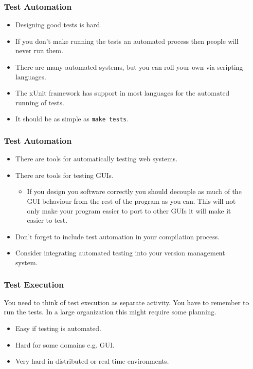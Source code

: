 \documentclass{beamer}
\begin{document}
\begin{frame}
  \frametitle{Test Automation}
  \begin{itemize}
  \item Designing good tests is hard.
  \item If you don't make running the tests an automated process then
    people will never run them.
  \item There are many automated systems, but you can roll your own
    via scripting languages.   
  \item The xUnit framework has support in most languages for the
    automated running of tests. 
  \item It should be as simple as {\tt make tests}.
  \end{itemize}
\end{frame}
\begin{frame}
  \frametitle{Test Automation}
  \begin{itemize}
  \item There are tools for automatically testing web systems.
  \item There are tools for testing GUIs.
    \begin{itemize}
    \item If you design you software correctly you should decouple as
      much of the GUI behaviour from the rest of the program as you
      can. This will not only make your program easier to port to
      other GUIs it will make it easier to test.
    \end{itemize}
  \item Don't forget to include test  automation in your compilation process.
  \item Consider integrating automated testing into your version
    management system.  
  \end{itemize}
\end{frame}
\begin{frame}
  \frametitle{Test Execution}
You need to think of test execution as separate activity. You have to
remember to run the tests. In a large organization this might require
some planning.    
  \begin{itemize}
  \item Easy if testing is automated.
  \item Hard for some domains e.g. GUI.
  \item Very hard in distributed or real time environments.
  \end{itemize}
\end{frame}
\end{document}
